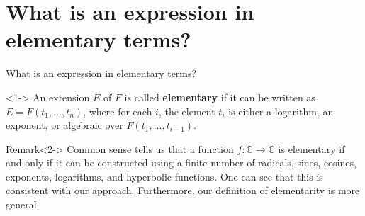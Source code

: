 \documentclass[8pt]{beamer}
\renewcommand{\C}{\ensuremath{\mathbb{C}}}
\renewcommand{\|}{\ensuremath{\hspace{0.1cm} | \hspace{0.1cm}}}
\begin{document}
    \section{What is an expression in elementary terms?}
    \begin{frame}{What is an expression in elementary terms?}
        \begin{definition}<1->
            An extension $E$ of $F$ is called \textbf{elementary} if it can be written as $E = F(t_1, \ldots, t_n)$, where for each $i$, the element $t_i$ is either a logarithm, an exponent, or algebraic over $F(t_1, \ldots, t_{i-1})$.
        \end{definition}
        \begin{block}{Remark}<2->
            Common sense tells us that a function $f: \C \to \C$ is elementary if and only if it can be constructed using a finite number of radicals, sines, cosines, exponents, logarithms, and hyperbolic functions.
            One can see that this is consistent with our approach. Furthermore, our definition of elementarity is more general.
        \end{block}
    \end{frame}
\end{document}
